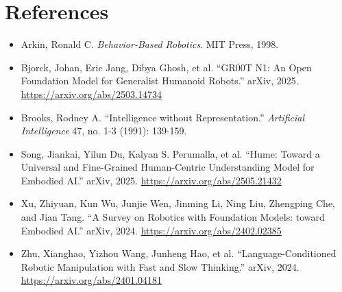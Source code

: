 \documentclass[11pt]{article}
\begin{document}
\section*{References}

\begin{itemize}
\item Arkin, Ronald C. \textit{Behavior-Based Robotics}. MIT Press, 1998.
\item Bjorck, Johan, Eric Jang, Dibya Ghosh, et al. ``GR00T N1: An Open Foundation Model for Generalist Humanoid Robots.'' arXiv, 2025. \url{https://arxiv.org/abs/2503.14734}
\item Brooks, Rodney A. ``Intelligence without Representation.'' \textit{Artificial Intelligence} 47, no. 1-3 (1991): 139-159.
\item Song, Jiankai, Yilun Du, Kalyan S. Perumalla, et al. ``Hume: Toward a Universal and Fine-Grained Human-Centric Understanding Model for Embodied AI.'' arXiv, 2025. \url{https://arxiv.org/abs/2505.21432}
\item Xu, Zhiyuan, Kun Wu, Junjie Wen, Jinming Li, Ning Liu, Zhengping Che, and Jian Tang. ``A Survey on Robotics with Foundation Models: toward Embodied AI.'' arXiv, 2024. \url{https://arxiv.org/abs/2402.02385}
\item Zhu, Xianghao, Yizhou Wang, Junheng Hao, et al. ``Language-Conditioned Robotic Manipulation with Fast and Slow Thinking.'' arXiv, 2024. \url{https://arxiv.org/abs/2401.04181}
\end{itemize}
\end{document}

